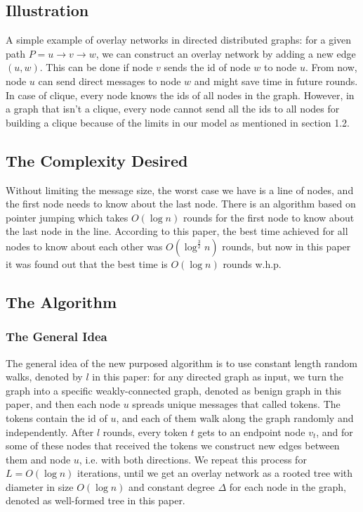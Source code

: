 \documentclass[11pt]{article}
\begin{document}
\subsection{Illustration}
A simple example of overlay networks in directed distributed graphs: for a given path $P=u\rightarrow v \rightarrow w$, we can construct an overlay network by adding a new edge $(u,w)$. This can be done if node $v$ sends the id of node $w$ to node $u$. From now, node $u$ can send direct messages to node $w$ and might save time in future rounds. In case of clique, every node knows the ids of all nodes in the graph. However, in a graph that isn't a clique, every node cannot send all the ids to all nodes for building a clique because of the limits in our model as mentioned in section 1.2.

\subsection{The Complexity Desired}
Without limiting the message size, the worst case we have is a line of nodes, and the first node needs to know about the last node. There is an algorithm based on pointer jumping which takes $O(\log{n})$ rounds for the first node to know about the last node in the line. According to this paper, the best time achieved for all nodes to know about each other was $O(\log^{\frac{3}{2}}n)$ rounds, but now in this paper it was found out that the best time is $O(\log{n})$ rounds w.h.p.

\subsection{The Algorithm}
\subsubsection{The General Idea}
The general idea of the new purposed algorithm is to use constant length random walks, denoted by $l$ in this paper: for any directed graph as input, we turn the graph into a specific weakly-connected graph, denoted as benign graph in this paper, and then each node $u$ spreads unique messages that called tokens. The tokens contain the id of $u$, and each of them walk along the graph randomly and independently. After $l$ rounds, every token $t$ gets to an endpoint node $v_{t}$, and for some of these nodes that received the tokens we construct new edges between them and node $u$, i.e. with both directions. We repeat this process for $L=O(\log{n})$ iterations, until we get an overlay network as a rooted tree with diameter in size $O(\log{n})$ and constant degree $\Delta$ for each node in the graph, denoted as well-formed tree in this paper.
\end{document}
